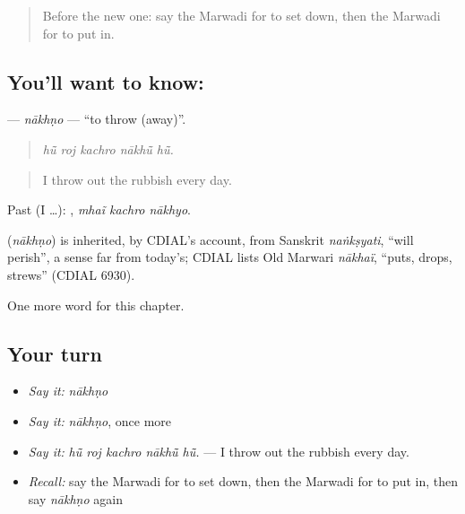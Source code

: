 \label{lesson:MW-C180-nakhno}



\begin{quote}
Before the new one: say the Marwadi for to set down, then the Marwadi for to put in.
\end{quote}

\subsection*{You'll want to know: }
\textbf{} — \emph{nākhṇo} — \textquotedblleft{}to throw (away)\textquotedblright{}.

\begin{quote}
    
\end{quote}

\begin{quote}
\emph{hū̃ roj kachro nākhū̃ hū̃.}
\end{quote}

\begin{quote}
I throw out the rubbish every day.
\end{quote}

Past (I …):   , \emph{mhaĩ kachro nākhyo}.

\begin{cousinweb}
\textbf{} (\emph{nākhṇo}) is inherited, by CDIAL's account, from Sanskrit \emph{naṅkṣyati}, \textquotedblleft{}will perish\textquotedblright{}, a sense far from today's; CDIAL lists Old Marwari \emph{nākhaï}, \textquotedblleft{}puts, drops, strews\textquotedblright{} (CDIAL 6930).
\end{cousinweb}

\begin{grammarlens}[title={What you've built}]
One more word for this chapter.
\end{grammarlens}

\subsection*{Your turn}
\begin{itemize}
\raggedright
  \item \emph{Say it:} \emph{nākhṇo}
  \item \emph{Say it:} \emph{nākhṇo}, once more
  \item \emph{Say it:} \emph{hū̃ roj kachro nākhū̃ hū̃.} — I throw out the rubbish every day.
  \item \emph{Recall:} say the Marwadi for to set down, then the Marwadi for to put in, then say \emph{nākhṇo} again
\end{itemize}

